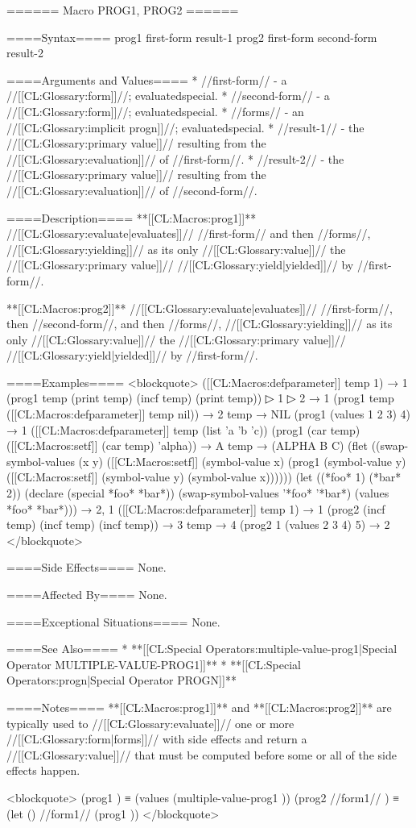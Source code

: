 ====== Macro PROG1, PROG2 ======

====Syntax====
\DefmacWithValues prog1 {first-form } {result-1} \DefmacWithValues prog2 {first-form second-form } {result-2}

====Arguments and Values====
  * //first-form// - a //[[CL:Glossary:form]]//; evaluatedspecial.
  * //second-form// - a //[[CL:Glossary:form]]//; evaluatedspecial.
  * //forms// - an //[[CL:Glossary:implicit progn]]//; evaluatedspecial.
  * //result-1// - the //[[CL:Glossary:primary value]]// resulting from the //[[CL:Glossary:evaluation]]// of //first-form//.
  * //result-2// - the //[[CL:Glossary:primary value]]// resulting from the //[[CL:Glossary:evaluation]]// of //second-form//.

====Description====
**[[CL:Macros:prog1]]** //[[CL:Glossary:evaluate|evaluates]]// //first-form// and then //forms//, //[[CL:Glossary:yielding]]// as its only //[[CL:Glossary:value]]// the //[[CL:Glossary:primary value]]// //[[CL:Glossary:yield|yielded]]// by //first-form//.

**[[CL:Macros:prog2]]** //[[CL:Glossary:evaluate|evaluates]]// //first-form//, then //second-form//, and then //forms//, //[[CL:Glossary:yielding]]// as its only //[[CL:Glossary:value]]// the //[[CL:Glossary:primary value]]// //[[CL:Glossary:yield|yielded]]// by //first-form//.

====Examples====
<blockquote> ([[CL:Macros:defparameter]] temp 1) → 1 (prog1 temp (print temp) (incf temp) (print temp))
▷ 1
▷ 2 → 1 (prog1 temp ([[CL:Macros:defparameter]] temp nil)) → 2 temp → NIL (prog1 (values 1 2 3) 4) → 1 ([[CL:Macros:defparameter]] temp (list 'a 'b 'c)) (prog1 (car temp) ([[CL:Macros:setf]] (car temp) 'alpha)) → A temp → (ALPHA B C) (flet ((swap-symbol-values (x y) ([[CL:Macros:setf]] (symbol-value x) (prog1 (symbol-value y) ([[CL:Macros:setf]] (symbol-value y) (symbol-value x)))))) (let ((*foo* 1) (*bar* 2)) (declare (special *foo* *bar*)) (swap-symbol-values '*foo* '*bar*) (values *foo* *bar*))) → 2, 1 ([[CL:Macros:defparameter]] temp 1) → 1 (prog2 (incf temp) (incf temp) (incf temp)) → 3 temp → 4 (prog2 1 (values 2 3 4) 5) → 2 </blockquote>

====Side Effects====
None.

====Affected By====
None.

====Exceptional Situations====
None.

====See Also====
  * **[[CL:Special Operators:multiple-value-prog1|Special Operator MULTIPLE-VALUE-PROG1]]**
  * **[[CL:Special Operators:progn|Special Operator PROGN]]**

====Notes====
**[[CL:Macros:prog1]]** and **[[CL:Macros:prog2]]** are typically used to //[[CL:Glossary:evaluate]]// one or more //[[CL:Glossary:form|forms]]// with side effects and return a //[[CL:Glossary:value]]// that must be computed before some or all of the side effects happen.

<blockquote> (prog1 ) ≡ (values (multiple-value-prog1 )) (prog2 //form1// ) ≡ (let () //form1// (prog1 )) </blockquote>

